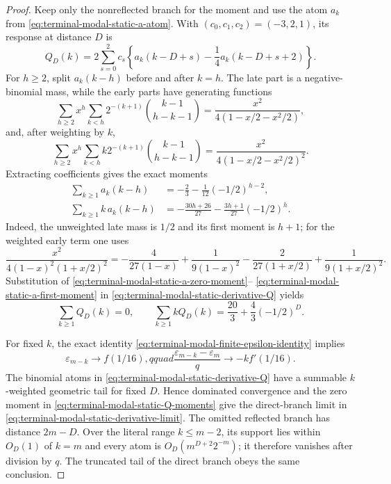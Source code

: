 \begin{proof}
Keep only the nonreflected branch for the moment and use the atom
$a_k$ from \eqref{eq:terminal-modal-static-a-atom}.  With
$(c_0,c_1,c_2)=(-3,2,1)$, its response at distance $D$ is
\begin{equation}
 Q_D(k)=2\sum_{s=0}^2c_s\left\{
 a_k(k-D+s)-\frac14a_k(k-D+s+2)\right\}.
 \label{eq:terminal-modal-static-derivative-Q}
\end{equation}
For $h\ge2$, split $a_k(k-h)$ before and after $k=h$.  The late part is a
negative-binomial mass, while the early parts have generating functions
\[
 \sum_{h\ge2}x^h\sum_{k<h}
 2^{-(k+1)}\binom{k-1}{h-k-1}
 =\frac{x^2}{4(1-x/2-x^2/2)},
\]
and, after weighting by $k$,
\[
 \sum_{h\ge2}x^h\sum_{k<h}
 k2^{-(k+1)}\binom{k-1}{h-k-1}
 =\frac{x^2}{4(1-x/2-x^2/2)^2}.
\]
Extracting coefficients gives the exact moments
\begin{align}
 \sum_{k\ge1}a_k(k-h)
 &=-\frac23-\frac1{12}(-1/2)^{h-2},
 \label{eq:terminal-modal-static-a-zero-moment}\\
 \sum_{k\ge1}k\,a_k(k-h)
 &=-\frac{30h+26}{27}
   -\frac{3h+1}{27}(-1/2)^h.
 \label{eq:terminal-modal-static-a-first-moment}
\end{align}
Indeed, the unweighted late mass is $1/2$ and its first moment is $h+1$;
for the weighted early term one uses
\[
 \frac{x^2}{4(1-x)^2(1+x/2)^2}
 =-\frac4{27(1-x)}+\frac1{9(1-x)^2}
  -\frac2{27(1+x/2)}+\frac1{9(1+x/2)^2}.
\]
Substitution of
\eqref{eq:terminal-modal-static-a-zero-moment}--
\eqref{eq:terminal-modal-static-a-first-moment} in
\eqref{eq:terminal-modal-static-derivative-Q} yields
\begin{equation}
 \sum_{k\ge1}Q_D(k)=0,
 \qquad
 \sum_{k\ge1}kQ_D(k)
 =\frac{20}{3}+\frac43(-1/2)^D.
 \label{eq:terminal-modal-static-Q-moments}
\end{equation}

For fixed $k$, the exact identity
\eqref{eq:terminal-modal-finite-epsilon-identity} implies
\[
 \varepsilon_{m-k}\longrightarrow f(1/16),qquad
 \frac{\varepsilon_{m-k}-\varepsilon_m}{q}
 \longrightarrow-kf'(1/16).
\]
The binomial atoms in \eqref{eq:terminal-modal-static-derivative-Q} have a
summable $k$-weighted geometric tail for fixed $D$.  Hence dominated
convergence and the zero moment in
\eqref{eq:terminal-modal-static-Q-moments} give the direct-branch limit in
\eqref{eq:terminal-modal-static-derivative-limit}.  The omitted reflected
branch has distance $2m-D$.  Over the literal range $k\le m-2$, its support
lies within $O_D(1)$ of $k=m$ and every atom is
$O_D(m^{D+2}2^{-m})$; it therefore vanishes after division by $q$.  The
truncated tail of the direct branch obeys the same conclusion.


\end{proof}
